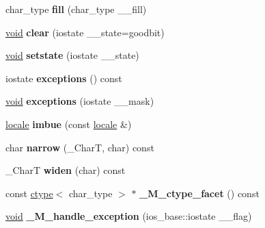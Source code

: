 \begin{DoxyCompactItemize}
\item 
\mbox{\label{classbasic__ios_a0b9e2353ea72a29f4b695073d32e3151}} 
char\+\_\+type {\bfseries fill} (char\+\_\+type \+\_\+\+\_\+fill)
\item 
\mbox{\label{classbasic__ios_aafc1812538d65f35f729434f0f6a5b29}} 
\hyperlink{interfacevoid}{void} {\bfseries clear} (iostate \+\_\+\+\_\+state=goodbit)
\item 
\mbox{\label{classbasic__ios_abcc76399c547d6d191e1e1bfc1b65fda}} 
\hyperlink{interfacevoid}{void} {\bfseries setstate} (iostate \+\_\+\+\_\+state)
\item 
\mbox{\label{classbasic__ios_a084056642043ae2678213fa17687e06b}} 
iostate {\bfseries exceptions} () const
\item 
\mbox{\label{classbasic__ios_ab147abd58cf43cd3b2a0b9688cd03907}} 
\hyperlink{interfacevoid}{void} {\bfseries exceptions} (iostate \+\_\+\+\_\+mask)
\item 
\mbox{\label{classbasic__ios_a69be7304b5d08132110b866c0095fc6f}} 
\hyperlink{classlocale}{locale} {\bfseries imbue} (const \hyperlink{classlocale}{locale} \&)
\item 
\mbox{\label{classbasic__ios_ad3a148edd630b0d34cf1d82fcdee9d33}} 
char {\bfseries narrow} (\+\_\+\+CharT, char) const
\item 
\mbox{\label{classbasic__ios_a9709fd941028576cc4b7ad82e70bc7b2}} 
\+\_\+\+CharT {\bfseries widen} (char) const
\item 
\mbox{\label{classbasic__ios_a88a132a856c1628c0b2113836d4cee77}} 
const \hyperlink{classctype}{ctype}$<$ char\+\_\+type $>$ $\ast$ {\bfseries \+\_\+\+M\+\_\+ctype\+\_\+facet} () const
\item 
\mbox{\label{classbasic__ios_ad40af29add2453bf0b908fa9383cdcc3}} 
\hyperlink{interfacevoid}{void} {\bfseries \+\_\+\+M\+\_\+handle\+\_\+exception} (ios\+\_\+base\+::iostate \+\_\+\+\_\+flag)
\end{DoxyCompactItemize}
